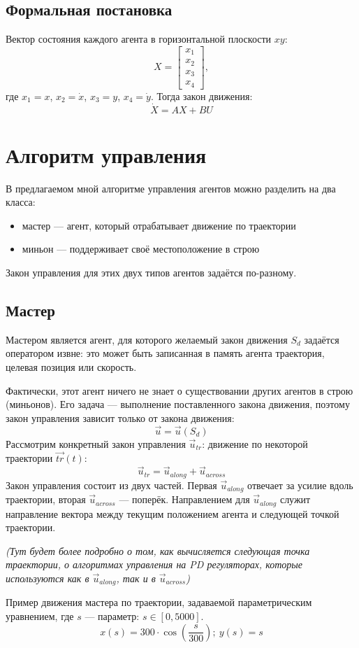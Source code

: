 \documentclass[a4paper, 14pt]{extarticle}
\begin{document}
\subsection{Формальная постановка}
Вектор состояния каждого агента в горизонтальной плоскости $xy$:
$$ X = 
\begin{bmatrix}
	x_1 \\
	x_2 \\
	x_3 \\
	x_4
\end{bmatrix} ,
$$
где $x_1 = x$, $x_2 = \dot{x}$, $x_3 = y$, $x_4 = \dot{y}$. Тогда закон движения:
$$\dot{X} = AX + BU$$

\section{Алгоритм управления}
В предлагаемом мной алгоритме управления агентов можно разделить на два класса:
\begin{itemize}
	\item мастер — агент, который отрабатывает движение по траектории
	\item миньон — поддерживает своё местоположение в строю
\end{itemize}
Закон управления для этих двух типов агентов задаётся по-разному.
\subsection{Мастер}
Мастером является агент, для которого желаемый закон движения $S_d$ задаётся оператором извне: это может быть записанная в память агента траектория, целевая позиция или скорость. \par
Фактически, этот агент ничего не знает о существовании других агентов в строю (миньонов). Его задача — выполнение поставленного закона движения, поэтому закон управления зависит только от закона движения:
$$ \vec{u} = \vec{u}(S_d)$$
Рассмотрим конкретный закон управления $\vec{u}_{tr}$: движение по некоторой траектории $\vec{tr}(t)$:
$$ \vec{u}_{tr} = \vec{u}_{along} + \vec{u}_{across} $$
Закон управления состоит из двух частей. Первая $\vec{u}_{along}$ отвечает за усилие вдоль траектории, вторая $\vec{u}_{across}$ — поперёк. Направлением для $\vec{u}_{along}$ служит направление вектора между текущим положением агента и следующей точкой траектории.
\begin{center}{\textit{ (Тут будет более подробно о том, как вычисляется следующая точка траектории, о алгоритмах управления на PD регуляторах, которые используются как в $\vec{u}_{along}$, так и в $\vec{u}_{across}$)}}
\end{center}
Пример движения мастера по траектории, задаваемой параметрическим уравнением, где $s$ — параметр: $s \in [0, 5000]$.
$$x(s) = 300 \cdot \cos(\frac{s}{300}); \ y(s) = s$$
\end{document}
